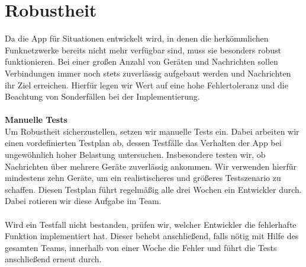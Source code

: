 \section{Robustheit}
Da die App für Situationen entwickelt wird, in denen die herkömmlichen Funknetzwerke bereits nicht mehr verfügbar sind, muss sie besonders robust funktionieren. Bei einer großen Anzahl von Geräten und Nachrichten sollen Verbindungen immer noch stets zuverlässig aufgebaut werden und Nachrichten ihr Ziel erreichen. Hierfür legen wir Wert auf eine hohe Fehlertoleranz und die Beachtung von Sonderfällen bei der Implementierung.\\\\
\textbf{Manuelle Tests}\\
Um Robustheit sicherzustellen, setzen wir manuelle Tests ein. Dabei arbeiten wir einen vordefinierten Testplan ab, dessen Testfälle das Verhalten der App bei ungewöhnlich hoher Belastung untersuchen. Insbesondere testen wir, ob Nachrichten über mehrere Geräte zuverlässig ankommen. Wir verwenden hierfür mindestens zehn Geräte, um ein realistischeres und größeres Testszenario zu schaffen. Diesen Testplan führt regelmäßig alle drei Wochen ein Entwickler durch. Dabei rotieren wir diese Aufgabe im Team.\\\\
Wird ein Testfall nicht bestanden, prüfen wir, welcher Entwickler die fehlerhafte Funktion implementiert hat. Dieser behebt anschließend, falls nötig mit Hilfe des gesamten Teams, innerhalb von einer Woche die Fehler und führt die Tests anschließend erneut durch.
